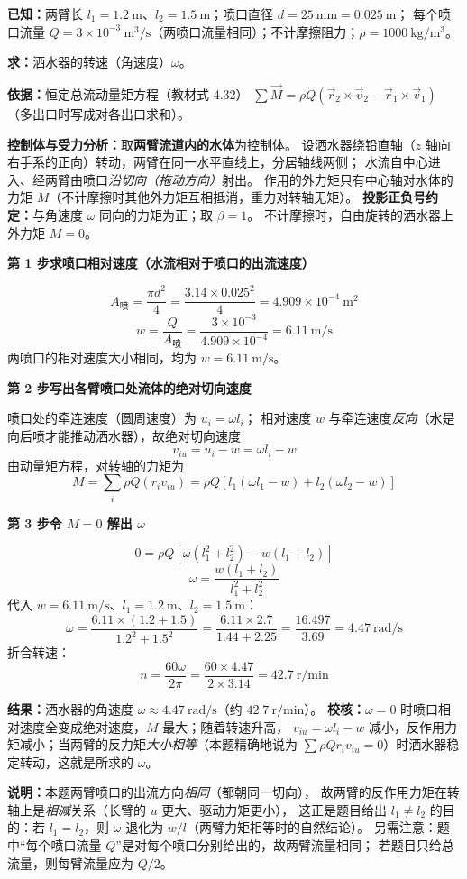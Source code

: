 \begin{jie}
\textbf{已知：}两臂长 $l_1=1.2\ \mathrm{m}$、$l_2=1.5\ \mathrm{m}$；喷口直径 $d=25\ \mathrm{mm}=0.025\ \mathrm{m}$；
每个喷口流量 $Q=3\times10^{-3}\ \mathrm{m^3/s}$（两喷口流量相同）；不计摩擦阻力；$\rho=1000\ \mathrm{kg/m^3}$。

\textbf{求：}洒水器的转速（角速度）$\omega$。

\textbf{依据：}恒定总流动量矩方程（教材式 4.32）
$\sum\vec M=\rho Q\left(\vec r_2\times\vec v_2-\vec r_1\times\vec v_1\right)$（多出口时写成对各出口求和）。

\textbf{控制体与受力分析：}取\textbf{两臂流道内的水体}为控制体。
设洒水器绕铅直轴（$z$ 轴向右手系的正向）转动，两臂在同一水平直线上，分居轴线两侧；
水流自中心进入、经两臂由喷口\emph{沿切向（拖动方向）}射出。
作用的外力矩只有中心轴对水体的力矩 $M$（不计摩擦时其他外力矩互相抵消，重力对转轴无矩）。
\textbf{投影正负号约定：}与角速度 $\omega$ 同向的力矩为正；取 $\beta=1$。
不计摩擦时，自由旋转的洒水器上外力矩 $M=0$。

\textbf{第 1 步\quad 求喷口相对速度（水流相对于喷口的出流速度）}

\[ A_{\text{喷}}=\frac{\pi d^2}{4}=\frac{3.14\times0.025^2}{4}=4.909\times10^{-4}\ \mathrm{m^2} \]
\[ w=\frac{Q}{A_{\text{喷}}}=\frac{3\times10^{-3}}{4.909\times10^{-4}}=6.11\ \mathrm{m/s} \]
两喷口的相对速度大小相同，均为 $w=6.11\ \mathrm{m/s}$。

\textbf{第 2 步\quad 写出各臂喷口处流体的绝对切向速度}

喷口处的牵连速度（圆周速度）为 $u_i=\omega l_i$；
相对速度 $w$ 与牵连速度\emph{反向}（水是向后喷才能推动洒水器），故绝对切向速度
\[ v_{iu}=u_i-w=\omega l_i-w \]
由动量矩方程，对转轴的力矩为
\[ M=\sum_i\rho Q\left(r_iv_{iu}\right)
   =\rho Q\left[l_1(\omega l_1-w)+l_2(\omega l_2-w)\right] \]

\textbf{第 3 步\quad 令 $M=0$ 解出 $\omega$}

\[ 0=\rho Q\left[\omega\left(l_1^2+l_2^2\right)-w\left(l_1+l_2\right)\right] \]
\[ \omega=\frac{w\left(l_1+l_2\right)}{l_1^2+l_2^2} \]
代入 $w=6.11\ \mathrm{m/s}$、$l_1=1.2\ \mathrm{m}$、$l_2=1.5\ \mathrm{m}$：
\[ \omega=\frac{6.11\times(1.2+1.5)}{1.2^2+1.5^2}=\frac{6.11\times2.7}{1.44+2.25}
   =\frac{16.497}{3.69}=4.47\ \mathrm{rad/s} \]
折合转速：
\[ n=\frac{60\omega}{2\pi}=\frac{60\times4.47}{2\times3.14}=42.7\ \mathrm{r/min} \]

\textbf{结果：}洒水器的角速度 $\omega\approx4.47\ \mathrm{rad/s}$（约 $42.7\ \mathrm{r/min}$）。
\textbf{校核：}$\omega=0$ 时喷口相对速度全变成绝对速度，$M$ 最大；随着转速升高，
$v_{iu}=\omega l_i-w$ 减小，反作用力矩减小；当两臂的反力矩\emph{大小相等}（本题精确地说为
$\sum\rho Qr_iv_{iu}=0$）时洒水器稳定转动，这就是所求的 $\omega$。

\textbf{说明：}本题两臂喷口的出流方向\emph{相同}（都朝同一切向），
故两臂的反作用力矩在转轴上是\emph{相减}关系（长臂的 $u$ 更大、驱动力矩更小），
这正是题目给出 $l_1\neq l_2$ 的目的：若 $l_1=l_2$，则 $\omega$ 退化为 $w/l$（两臂力矩相等时的自然结论）。
另需注意：题中“每个喷口流量 $Q$”是对每个喷口分别给出的，故两臂流量相同；
若题目只给总流量，则每臂流量应为 $Q/2$。
\end{jie}

